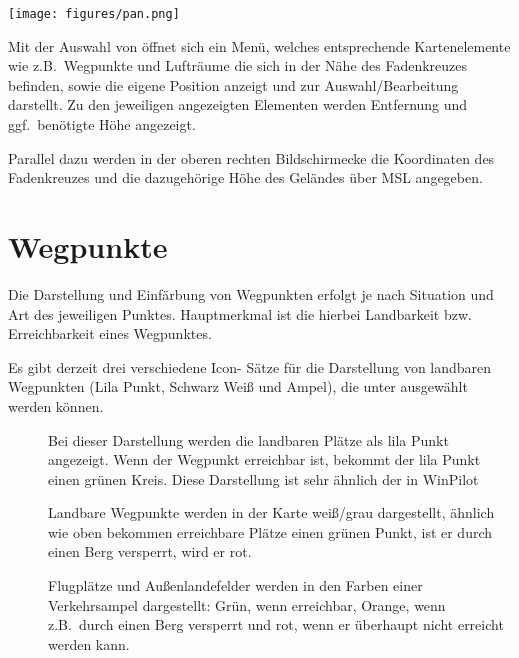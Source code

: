 \begin{center}\texttt{[image: figures/pan.png]}
\end{center}
Mit der Auswahl von  öffnet sich ein Menü, welches entsprechende Kartenelemente wie z.B.\ Wegpunkte und Lufträume die sich in der Nähe des Fadenkreuzes befinden, sowie die eigene Position anzeigt und zur Auswahl/Bearbeitung darstellt. Zu den jeweiligen angezeigten Elementen werden Entfernung und ggf.\ benötigte Höhe angezeigt.

Parallel dazu werden in der oberen rechten Bildschirmecke die Koordinaten des Fadenkreuzes und die dazugehörige Höhe des Geländes über MSL angegeben.  

\section{Wegpunkte} \label{sec:waypoint-schemes}
Die Darstellung und Einfärbung von Wegpunkten erfolgt je nach Situation und Art des jeweiligen Punktes. Hauptmerkmal ist die hierbei Landbarkeit bzw. Erreichbarkeit eines Wegpunktes.

Es gibt derzeit drei verschiedene Icon- Sätze  für die Darstellung von landbaren Wegpunkten  (Lila Punkt, Schwarz Weiß und Ampel), die unter 
 ausgewählt werden können.

\begin{description}
   \item[] Bei dieser Darstellung werden die landbaren Plätze als lila Punkt angezeigt. Wenn der Wegpunkt erreichbar ist, bekommt der lila Punkt einen grünen Kreis.  Diese Darstellung ist sehr ähnlich der in WinPilot
   \item[]  Landbare Wegpunkte werden in der Karte weiß/grau dargestellt, ähnlich wie oben bekommen erreichbare Plätze einen grünen Punkt, ist er durch einen Berg versperrt, wird er rot. 
   \item[] Flugplätze und Außenlandefelder werden in den Farben einer Verkehrsampel dargestellt: Grün, wenn erreichbar, Orange, wenn z.B.\ durch einen Berg versperrt und rot, wenn er überhaupt nicht erreicht werden kann.
\end{description}

